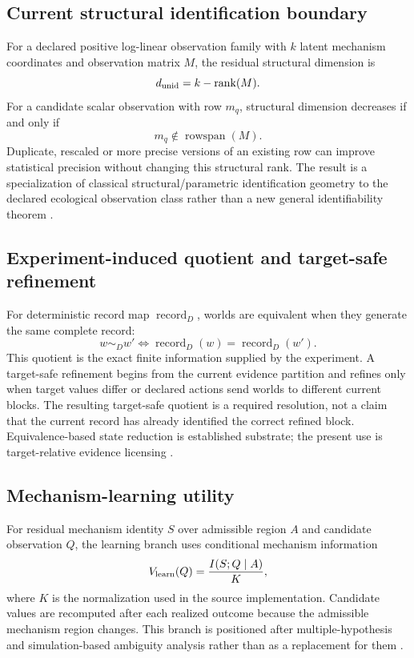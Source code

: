 \documentclass[11pt]{article}
\begin{document}
\subsection{Current structural identification boundary}
For a declared positive log-linear observation family with $k$ latent mechanism coordinates and observation matrix $M$, the residual structural dimension is
\[
d_{\rm unid}=k-\operatorname{rank}(M).
\]
For a candidate scalar observation with row $m_q$, structural dimension decreases if and only if
\[
m_q\notin \operatorname{rowspan}(M).
\]
Duplicate, rescaled or more precise versions of an existing row can improve statistical precision without changing this structural rank. The result is a specialization of classical structural/parametric identification geometry to the declared ecological observation class rather than a new general identifiability theorem \cite{BellmanAstrom1970,Rothenberg1971}.

\subsection{Experiment-induced quotient and target-safe refinement}
For deterministic record map $\operatorname{record}_D$, worlds are equivalent when they generate the same complete record:
\[
w\sim_D w'\iff \operatorname{record}_D(w)=\operatorname{record}_D(w').
\]
This quotient is the exact finite information supplied by the experiment. A target-safe refinement begins from the current evidence partition and refines only when target values differ or declared actions send worlds to different current blocks. The resulting target-safe quotient is a required resolution, not a claim that the current record has already identified the correct refined block. Equivalence-based state reduction is established substrate; the present use is target-relative evidence licensing \cite{GivanDeanGreig2003}.

\subsection{Mechanism-learning utility}
For residual mechanism identity $S$ over admissible region $A$ and candidate observation $Q$, the learning branch uses conditional mechanism information
\[
V_{\rm learn}(Q)=\frac{I(S;Q\mid A)}{K},
\]
where $K$ is the normalization used in the source implementation. Candidate values are recomputed after each realized outcome because the admissible mechanism region changes. This branch is positioned after multiple-hypothesis and simulation-based ambiguity analysis rather than as a replacement for them \cite{BeaumontEtAl2002,RobertEtAl2011,BetiniEtAl2017,YancoEtAl2020}.
\end{document}
